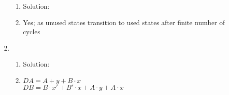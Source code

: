 \documentclass[12pt, a4paper]{article}
\begin{document}
\begin{enumerate}[Q\arabic*.]
\begin{enumerate}[(\alph*.)]
      \item Solution:\\

      \item Yes; as unused states transition to used states after finite number of cycles

    \end{enumerate}

  \item 
    \begin{enumerate}[(\alph*.)]
      \item Solution:\\

      \item $DA = A + y + B\cdot x$\\
        $DB = B\cdot x' + B'\cdot x + A\cdot y + A\cdot x$
    \end{enumerate}
\end{enumerate}
\end{document}
